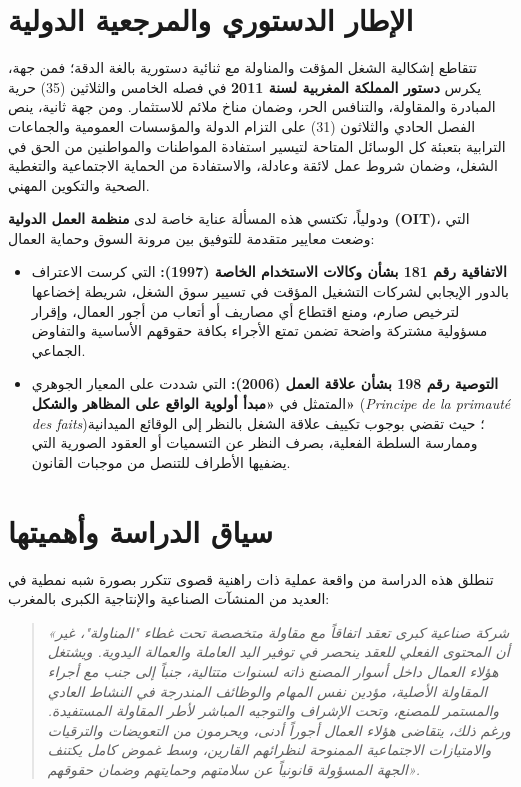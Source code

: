 \section*{الإطار الدستوري والمرجعية الدولية}

تتقاطع إشكالية الشغل المؤقت والمناولة مع ثنائية دستورية بالغة الدقة؛ فمن جهة، يكرس \textbf{دستور المملكة المغربية لسنة 2011} في فصله الخامس والثلاثين (35) حرية المبادرة والمقاولة، والتنافس الحر، وضمان مناخ ملائم للاستثمار. ومن جهة ثانية، ينص الفصل الحادي والثلاثون (31) على التزام الدولة والمؤسسات العمومية والجماعات الترابية بتعبئة كل الوسائل المتاحة لتيسير استفادة المواطنات والمواطنين من الحق في الشغل، وضمان شروط عمل لائقة وعادلة، والاستفادة من الحماية الاجتماعية والتغطية الصحية والتكوين المهني.

ودولياً، تكتسي هذه المسألة عناية خاصة لدى \textbf{منظمة العمل الدولية (OIT)}، التي وضعت معايير متقدمة للتوفيق بين مرونة السوق وحماية العمال:
\begin{itemize}
    \item \textbf{الاتفاقية رقم 181 بشأن وكالات الاستخدام الخاصة (1997):} التي كرست الاعتراف بالدور الإيجابي لشركات التشغيل المؤقت في تسيير سوق الشغل، شريطة إخضاعها لترخيص صارم، ومنع اقتطاع أي مصاريف أو أتعاب من أجور العمال، وإقرار مسؤولية مشتركة واضحة تضمن تمتع الأجراء بكافة حقوقهم الأساسية والتفاوض الجماعي.
    \item \textbf{التوصية رقم 198 بشأن علاقة العمل (2006):} التي شددت على المعيار الجوهري المتمثل في \textbf{«مبدأ أولوية الواقع على المظاهر والشكل»} (\textit{Principe de la primauté des faits})؛ حيث تقضي بوجوب تكييف علاقة الشغل بالنظر إلى الوقائع الميدانية وممارسة السلطة الفعلية، بصرف النظر عن التسميات أو العقود الصورية التي يضفيها الأطراف للتنصل من موجبات القانون.
\end{itemize}

\section*{سياق الدراسة وأهميتها}

تنطلق هذه الدراسة من واقعة عملية ذات راهنية قصوى تتكرر بصورة شبه نمطية في العديد من المنشآت الصناعية والإنتاجية الكبرى بالمغرب:
\begin{quote}
\textit{«شركة صناعية كبرى تعقد اتفاقاً مع مقاولة متخصصة تحت غطاء "المناولة"، غير أن المحتوى الفعلي للعقد ينحصر في توفير اليد العاملة والعمالة اليدوية. ويشتغل هؤلاء العمال داخل أسوار المصنع ذاته لسنوات متتالية، جنباً إلى جنب مع أجراء المقاولة الأصلية، مؤدين نفس المهام والوظائف المندرجة في النشاط العادي والمستمر للمصنع، وتحت الإشراف والتوجيه المباشر لأطر المقاولة المستفيدة. ورغم ذلك، يتقاضى هؤلاء العمال أجوراً أدنى، ويحرمون من التعويضات والترقيات والامتيازات الاجتماعية الممنوحة لنظرائهم القارين، وسط غموض كامل يكتنف الجهة المسؤولة قانونياً عن سلامتهم وحمايتهم وضمان حقوقهم».}
\end{quote}

